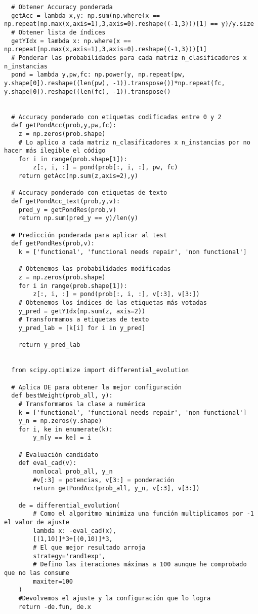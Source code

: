 \documentclass{article}
\begin{document}
\begin{verbatim}
  # Obtener Accuracy ponderada
  getAcc = lambda x,y: np.sum(np.where(x == np.repeat(np.max(x,axis=1),3,axis=0).reshape((-1,3)))[1] == y)/y.size
  # Obtener lista de índices 
  getYIdx = lambda x: np.where(x == np.repeat(np.max(x,axis=1),3,axis=0).reshape((-1,3)))[1]
  # Ponderar las probabilidades para cada matriz n_clasificadores x n_instancias
  pond = lambda y,pw,fc: np.power(y, np.repeat(pw, y.shape[0]).reshape((len(pw), -1)).transpose())*np.repeat(fc,  y.shape[0]).reshape((len(fc), -1)).transpose()

    
  # Accuracy ponderado con etiquetas codificadas entre 0 y 2
  def getPondAcc(prob,y,pw,fc):
    z = np.zeros(prob.shape)
    # Lo aplico a cada matriz n_clasificadores x n_instancias por no hacer más ilegible el código
    for i in range(prob.shape[1]):
        z[:, i, :] = pond(prob[:, i, :], pw, fc)
    return getAcc(np.sum(z,axis=2),y)
  
  # Accuracy ponderado con etiquetas de texto
  def getPondAcc_text(prob,y,v):
    pred_y = getPondRes(prob,v)
    return np.sum(pred_y == y)/len(y)
  
  # Predicción ponderada para aplicar al test
  def getPondRes(prob,v):
    k = ['functional', 'functional needs repair', 'non functional']
    
    # Obtenemos las probabilidades modificadas
    z = np.zeros(prob.shape)
    for i in range(prob.shape[1]):
        z[:, i, :] = pond(prob[:, i, :], v[:3], v[3:])
    # Obtenemos los índices de las etiquetas más votadas
    y_pred = getYIdx(np.sum(z, axis=2))
    # Transformamos a etiquetas de texto
    y_pred_lab = [k[i] for i in y_pred]

    return y_pred_lab


  from scipy.optimize import differential_evolution
  
  # Aplica DE para obtener la mejor configuración
  def bestWeight(prob_all, y):
    # Transformamos la clase a numérica
    k = ['functional', 'functional needs repair', 'non functional']
    y_n = np.zeros(y.shape)
    for i, ke in enumerate(k):
        y_n[y == ke] = i

    # Evaluación candidato    
    def eval_cad(v):
        nonlocal prob_all, y_n
        #v[:3] = potencias, v[3:] = ponderación
        return getPondAcc(prob_all, y_n, v[:3], v[3:])
    
    de = differential_evolution(
        # Como el algoritmo minimiza una función multiplicamos por -1 el valor de ajuste
        lambda x: -eval_cad(x),
        [(1,10)]*3+[(0,10)]*3,
        # El que mejor resultado arroja
        strategy='rand1exp',
        # Defino las iteraciones máximas a 100 aunque he comprobado que no las consume
        maxiter=100
    )
    #Devolvemos el ajuste y la configuración que lo logra
    return -de.fun, de.x
\end{verbatim}
\end{document}
